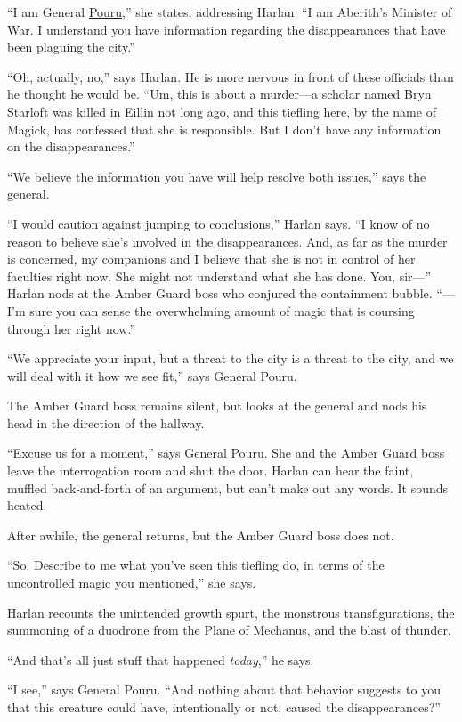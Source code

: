 \documentclass[smalldemyvopaper,11pt,twoside,onecolumn,openright,extrafontsizes]{memoir}
\begin{document}
``I am General \href{/characters/pouru/}{Pouru},'' she states,
addressing Harlan. ``I am Aberith's Minister of War. I understand you
have information regarding the disappearances that have been plaguing
the city.''

``Oh, actually, no,'' says Harlan. He is more nervous in front of these
officials than he thought he would be. ``Um, this is about a murder---a
scholar named Bryn Starloft was killed in Eillin not long ago, and this
tiefling here, by the name of Magick, has confessed that she is
responsible. But I don't have any information on the disappearances.''

``We believe the information you have will help resolve both issues,''
says the general.

``I would caution against jumping to conclusions,'' Harlan says. ``I
know of no reason to believe she's involved in the disappearances. And,
as far as the murder is concerned, my companions and I believe that she
is not in control of her faculties right now. She might not understand
what she has done. You, sir---'' Harlan nods at the Amber Guard boss who
conjured the containment bubble. ``---I'm sure you can sense the
overwhelming amount of magic that is coursing through her right now.''

``We appreciate your input, but a threat to the city is a threat to the
city, and we will deal with it how we see fit,'' says General Pouru.

The Amber Guard boss remains silent, but looks at the general and nods
his head in the direction of the hallway.

``Excuse us for a moment,'' says General Pouru. She and the Amber Guard
boss leave the interrogation room and shut the door. Harlan can hear the
faint, muffled back-and-forth of an argument, but can't make out any
words. It sounds heated.

After awhile, the general returns, but the Amber Guard boss does not.

``So. Describe to me what you've seen this tiefling do, in terms of the
uncontrolled magic you mentioned,'' she says.

Harlan recounts the unintended growth spurt, the monstrous
transfigurations, the summoning of a duodrone from the Plane of
Mechanus, and the blast of thunder.

``And that's all just stuff that happened \emph{today},'' he says.

``I see,'' says General Pouru. ``And nothing about that behavior
suggests to you that this creature could have, intentionally or not,
caused the disappearances?''
\end{document}
